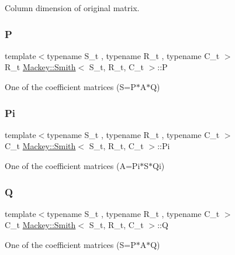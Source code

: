 Column dimension of original matrix. 

\mbox{\label{classMackey_1_1Smith_a711a1726ec0da22e9233aa269d66bf73}} 
\subsubsection{\texorpdfstring{P}{P}}
{\footnotesize\ttfamily template$<$typename S\+\_\+t , typename R\+\_\+t , typename C\+\_\+t $>$ \\
R\+\_\+t \hyperlink{classMackey_1_1Smith}{Mackey\+::\+Smith}$<$ S\+\_\+t, R\+\_\+t, C\+\_\+t $>$\+::P}



One of the coefficient matrices (S=P$\ast$\+A$\ast$Q) 

\mbox{\label{classMackey_1_1Smith_a890f70fcd15554ee0c3b8469ffb55fde}} 
\subsubsection{\texorpdfstring{Pi}{Pi}}
{\footnotesize\ttfamily template$<$typename S\+\_\+t , typename R\+\_\+t , typename C\+\_\+t $>$ \\
C\+\_\+t \hyperlink{classMackey_1_1Smith}{Mackey\+::\+Smith}$<$ S\+\_\+t, R\+\_\+t, C\+\_\+t $>$\+::Pi}



One of the coefficient matrices (A=Pi$\ast$\+S$\ast$\+Qi) 

\mbox{\label{classMackey_1_1Smith_aba53f81430955d8cf7f7ce4677486214}} 
\subsubsection{\texorpdfstring{Q}{Q}}
{\footnotesize\ttfamily template$<$typename S\+\_\+t , typename R\+\_\+t , typename C\+\_\+t $>$ \\
C\+\_\+t \hyperlink{classMackey_1_1Smith}{Mackey\+::\+Smith}$<$ S\+\_\+t, R\+\_\+t, C\+\_\+t $>$\+::Q}



One of the coefficient matrices (S=P$\ast$\+A$\ast$Q) 

